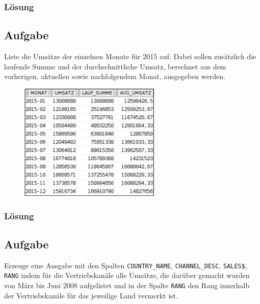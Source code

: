 \subsubsection*{Lösung}
\label{sec:uebung_07.aufgabe_03.loesung}


\subsection{Aufgabe}
\label{sec:uebung_07.aufgabe_04}
Liste die Umsätze der einzelnen Monate für 2015 auf. Dabei sollen zusätzlich die laufende Summe und der durchschnittliche Umsatz, berechnet aus dem vorherigen, aktuellen sowie nachfolgendem Monat, ausgegeben werden.

\begin{figure}[H]
  \centering
  \includegraphics[width=0.6\textwidth]{img//uebung_07_-_aufgabe_04.png}
  \label{img:uebung_07_-_aufgabe_04}
\end{figure}

\subsubsection*{Lösung}
\label{sec:uebung_07.aufgabe_04.loesung}


\subsection{Aufgabe}
\label{sec:uebung_07.aufgabe_05}
Erzeuge eine Ausgabe mit den Spalten \texttt{COUNTRY\_NAME}, \texttt{CHANNEL\_DESC}, \texttt{SALES\$}, \texttt{RANG} indem für die Vertriebskanäle alle Umsätze, die darüber gemacht wurden von März bis Juni 2008 aufgelistet und in der Spalte \texttt{RANG} den Rang innerhalb der Vertriebskanäle für das jeweilige Land vermerkt ist.

